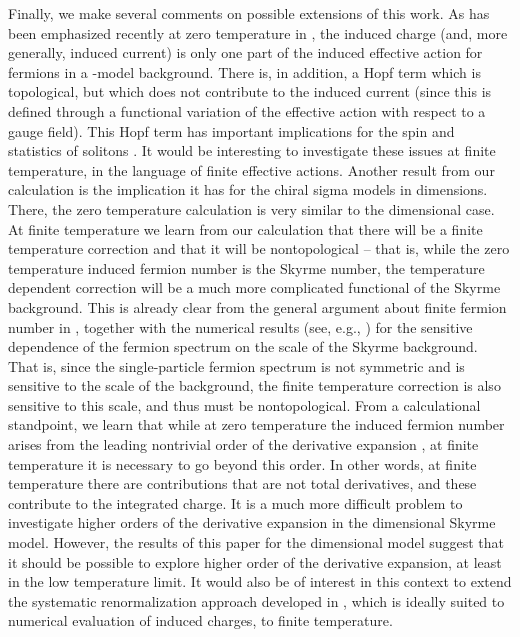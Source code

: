 \documentclass[a4paper,prd]{revtex4}
\begin{document}
Finally, we make several comments on possible extensions of this work. As has been
emphasized recently at zero temperature in \cite{aw,abanov}, the induced charge (and,
more generally, induced current) is only one part of the induced effective action for
fermions in a \myHighlight{$\sigma$}\coordHE{}-model background. There is, in addition, a Hopf term which is
topological, but which does not contribute to the induced current (since
this is defined through a functional variation of the effective action
with respect to a gauge field). This Hopf term has important implications
for the spin and statistics of solitons \cite{wilczekzee,aw,abanov}. It
would be interesting to investigate these issues at finite temperature,
in the language of finite \coordHE{} effective actions. Another result from our
calculation is the implication it has for the chiral sigma models in
\coordHE{} dimensions. There, the zero temperature calculation is very similar to the \coordHE{}
dimensional case. At finite temperature we learn from our calculation that there will
be a finite temperature correction and that it will be nontopological -- that is,
while the zero temperature induced fermion number is the Skyrme number, the
temperature dependent correction will be a much more complicated functional of the
Skyrme background. This is already clear from the general argument about finite \coordHE{}
fermion number in \cite{dr}, together with the numerical results (see, e.g.,
\cite{ripka}) for the sensitive dependence of the fermion spectrum on the scale of
the Skyrme background. That is, since the single-particle fermion spectrum
is not symmetric and is sensitive to the scale of the background, the
finite temperature correction is also sensitive to this scale, and thus
must be nontopological. From a calculational standpoint, we learn that
while at zero temperature the induced fermion number arises from the
leading nontrivial order of the derivative expansion
\cite{eric,ian}, at finite temperature it is necessary to go beyond this
order. In other words, at finite temperature there are contributions that
are not total derivatives, and these contribute to the integrated charge.
It is a much more difficult problem to investigate higher orders of the
derivative expansion in the \coordHE{} dimensional Skyrme model. However,
the results of this paper for the \coordHE{} dimensional model suggest
that it should be possible to explore higher order of the derivative
expansion, at least in the low temperature limit. It would also be of
interest in this context to extend the systematic renormalization approach
developed in \cite{jaffe2,noah}, which is ideally suited to numerical
evaluation of induced charges, to finite temperature.
 
\end{document}
